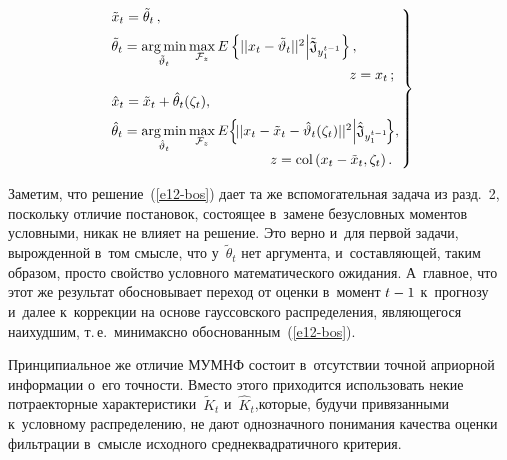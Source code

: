 \begin{multicols}{2}
\noindent
    \begin{equation}
    \left.
    \begin{array}{l}
    \hspace*{-3mm}\tilde{x}_t= \tilde{\theta}_t\,,\\[6pt]
        \hspace*{-3mm}\tilde{\theta}_t=\argmin\limits_{\tilde{\vartheta}_t} 
\max\limits_{\mathcal{F}_z} E \left\{ \vert \vert x_t-\tilde{\vartheta}_t\vert\vert^2\Big\vert 
\tilde{\mathfrak{J}}_{y_1^{t-1}}\right\},\\[6pt]
     \hspace*{57mm}z=x_t\,;\\[6pt]
        \hspace*{-3mm}\hat{x}_t=\tilde{x}_t+\hat{\theta}_t(\zeta_t),\\[6pt] 
    \hspace*{-3mm}\hat{\theta}_t=\argmin\limits_{\hat{\vartheta}_t} \max\limits_{\mathcal{F}_z} E \!\left\{\! \vert 
\vert x_t-\tilde{x}_t-\hat{\vartheta}_t(\zeta_t)\vert \vert^2\Big\vert 
\hat{\mathfrak{J}}_{y_1^{t-1}} \!\right\}\!,\\[6pt]
     \hspace*{37mm}z=\mathrm{col} \left(x_t-\tilde{x}_t,  \zeta_t\right).
    \end{array}\!\!
    \right\}\!\!\!\!
    \label{e12-bos}
    \end{equation}
    
    Заметим, что решение~(\ref{e12-bos}) дает та же вспомогательная задача 
из разд.~2, поскольку отличие постановок, состоящее в~замене безусловных 
моментов условными, никак не влияет на решение. Это верно и~для первой 
задачи, вырожденной в~том смысле, что у~$\tilde{\theta}_t$ нет аргумента, 
и~составляющей, таким образом, просто свойство условного математического 
ожидания. А~главное, что этот же результат обосновывает переход от оценки 
в~момент $t\hm-1$ к~прогнозу и~далее к~коррекции на основе гауссовского 
распределения, являющегося наихудшим, т.\,е.\ минимаксно 
обоснованным~(\ref{e12-bos}).
    
    Принципиальное же отличие МУМНФ состоит в~отсутствии точной 
априорной информации о~его точ\-ности. Вместо этого приходится использовать 
некие потраекторные характеристики~$\tilde{K}_t$ и~$\hat{K}_t$,\linebreak которые, 
будучи привязанными к~условному распределению, не дают однозначного 
понимания качества оценки фильтрации в~смысле исходного 
сред\-не\-квад\-ра\-тич\-но\-го критерия.
    

\end{multicols}
